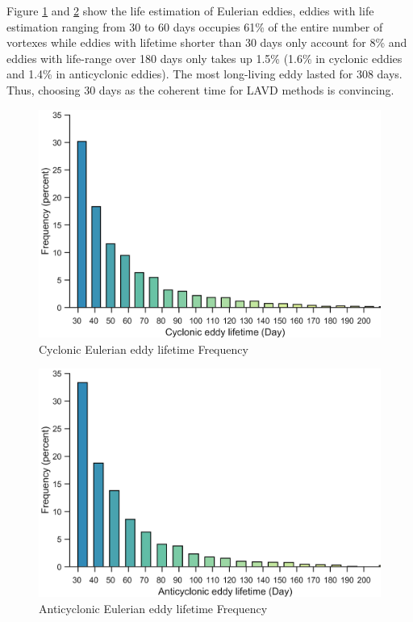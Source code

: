 Figure \ref{Cyclonic eddy lifetime Frequency} and \ref{Anticyclonic eddy lifetime Frequency}
show the life estimation of Eulerian eddies, eddies with life estimation ranging from 30 to 60 days occupies 61\% of the entire number of vortexes while eddies with lifetime shorter than 30 days only account for 8\% and eddies with life-range over 180 days only takes up 1.5\% (1.6\% in cyclonic eddies and 1.4\% in anticyclonic eddies). The most long-living eddy lasted for 308 days. Thus, choosing 30 days as the coherent time for LAVD methods is convincing. 

\begin{figure}[ht]
  \centering
  \setlength{\abovecaptionskip}{0.cm}
  \includegraphics[width=15cm]{chapter/figure/Cyclonic eddy lifetime Frequency.png}
  \caption
  {Cyclonic Eulerian eddy lifetime Frequency}
  \label{Cyclonic eddy lifetime Frequency}
\end{figure}

\begin{figure}[ht]
  \centering
  \setlength{\abovecaptionskip}{0.cm}
  \includegraphics[width=15cm]{chapter/figure/Anticyclonic eddy lifetime Frequency.png}
  \caption
  {Anticyclonic Eulerian eddy lifetime Frequency}
  \label{Anticyclonic eddy lifetime Frequency}
\end{figure}

